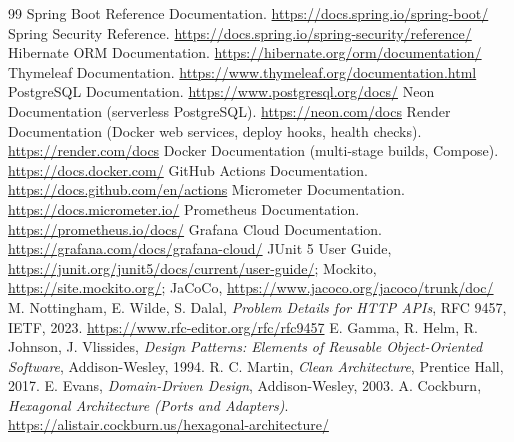 \documentclass[10pt,a4paper]{article}
\begin{document}
\begin{thebibliography}{99}\footnotesize
\setlength{\itemsep}{1pt}\setlength{\parskip}{0pt}
 Spring Boot Reference Documentation. \url{https://docs.spring.io/spring-boot/}
 Spring Security Reference. \url{https://docs.spring.io/spring-security/reference/}
 Hibernate ORM Documentation. \url{https://hibernate.org/orm/documentation/}
 Thymeleaf Documentation. \url{https://www.thymeleaf.org/documentation.html}
 PostgreSQL Documentation. \url{https://www.postgresql.org/docs/}
 Neon Documentation (serverless PostgreSQL). \url{https://neon.com/docs}
 Render Documentation (Docker web services, deploy hooks, health checks). \url{https://render.com/docs}
 Docker Documentation (multi-stage builds, Compose). \url{https://docs.docker.com/}
 GitHub Actions Documentation. \url{https://docs.github.com/en/actions}
 Micrometer Documentation. \url{https://docs.micrometer.io/}
 Prometheus Documentation. \url{https://prometheus.io/docs/}
 Grafana Cloud Documentation. \url{https://grafana.com/docs/grafana-cloud/}
 JUnit 5 User Guide, \url{https://junit.org/junit5/docs/current/user-guide/}; Mockito,
  \url{https://site.mockito.org/}; JaCoCo, \url{https://www.jacoco.org/jacoco/trunk/doc/}
 M. Nottingham, E. Wilde, S. Dalal, \emph{Problem Details for HTTP APIs}, RFC 9457, IETF, 2023.
  \url{https://www.rfc-editor.org/rfc/rfc9457}
 E. Gamma, R. Helm, R. Johnson, J. Vlissides, \emph{Design Patterns: Elements of Reusable Object-Oriented
  Software}, Addison-Wesley, 1994.
 R. C. Martin, \emph{Clean Architecture}, Prentice Hall, 2017.
 E. Evans, \emph{Domain-Driven Design}, Addison-Wesley, 2003.
 A. Cockburn, \emph{Hexagonal Architecture (Ports and Adapters)}.
  \url{https://alistair.cockburn.us/hexagonal-architecture/}
\end{thebibliography}
\end{document}

